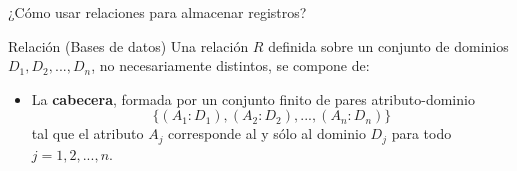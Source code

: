 \begin{frame}[fragile]{¿C\'omo usar relaciones para almacenar registros?}
    \begin{block}{Relaci\'on (Bases de datos)}
        Una relaci\'on $R$ definida sobre un conjunto de dominios
        $D_1, D_2, ..., D_n$, no necesariamente distintos, se compone de:
        \begin{itemize}
            \item La \textbf{cabecera}, formada por un conjunto finito de pares atributo-dominio
            $$
                \{(A_1:D_1), (A_2:D_2), ..., (A_n:D_n)\}
            $$
            tal que el atributo $A_j$ corresponde al y s\'olo al dominio $D_j$ para todo\\ $j=1,2,...,n$. 
        \end{itemize}
        \vspace{3mm}


      

    

\end{block}


\end{frame}


